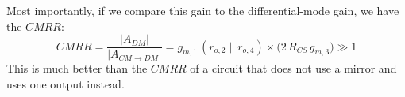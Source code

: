 Most importantly, if we compare this gain to the differential-mode gain, we have the $CMRR$:
    \begin{equation}
        CMRR = \frac{\left|A_{DM}\right|}{\left|A_{CM \to DM}\right|}
        = g_{m,1}\,\left(r_{o,2} \parallel r_{o,4}\right) \times \big(2\,R_{CS}\,g_{m,3}\big) \gg 1
    \end{equation}
This is much better than the $CMRR$ of a circuit that does not use a mirror and uses one output instead.
\newpage
